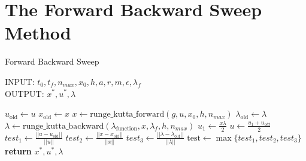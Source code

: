 \section{The Forward Backward Sweep Method}
\begin{algorithm}
	\caption{Forward Backward Sweep } \label{}
    INPUT: $t_0, t_f, n_{max}, x_0,h, a, r, m, \epsilon, \lambda_{f}$ \\
    OUTPUT: $x^*, u^*, \lambda$ \\
	\begin{algorithmic}[1]
				\State $u_{\text{old}} \gets u$ 
                \State $x_{\text{old}} \gets x$ 
                \State $ x \gets \text{runge\_kutta\_forward}(g, u, x_0, h,
                n_{max})$
                \State $\lambda_{\text{old}} \gets \lambda $
				\State $\lambda \gets \text{runge\_kutta\_backward}
                (\lambda_{\text{function}}, x, \lambda_f, h, n_{max})$
                \State $\displaystyle u_1 \gets \frac{x \lambda}{2}$
                \State $\displaystyle u \gets \frac{u_1 + u_{old}}{2}$
                \State $test_1 \gets \displaystyle 
                \frac{||u - u_{\text{old}}||}{||u||}$
                \State $test_2 \gets \displaystyle 
                \frac{||x - x_{\text{old}}||}{||x||}$
                \State $test_3 \gets \displaystyle 
                \frac{||\lambda - \lambda_{\text{old}}||}{||\lambda||}$
                \State $\text{test} \gets \max{ \{ test_1, test_2, test_3 \}}$
			\EndWhile\label{}
			\State \textbf{return} $ x^*, u^*, \lambda$
		\EndProcedure
	\end{algorithmic}
\end{algorithm}


